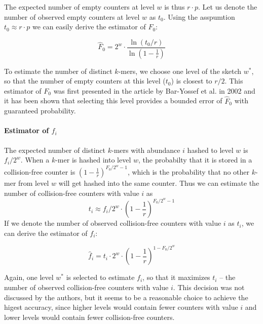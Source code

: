The expected number of empty counters at level $w$ is thus $r \cdot p$. Let us denote the
number of observed empty counters at level $w$ as $t_0$. Using the asspumtion
$t_0 \approx r \cdot p$ we can easily derive the estimator of $F_0$:

\begin{equation} \label{eq:hatF0}
\hat F_0 = 2^w \cdot \frac{\ln(t_0/r)}{\ln\left(1 - \frac{1}{r}\right)}
\end{equation}

To estimate the number of distinct $k$-mers, we choose one level of the sketch
$w^*$, so that the number of empty counters at this level ($t_0$) is closest to $r/2$.
This estimator of $F_0$ was first presented in the article by Bar-Yossef et al. in 2002
\cite{Bar-Yossef2002} and it has been shown that selecting this level provides a bounded 
error of $\hat F_0$ with guaranteed probability.

\paragraph{Estimator of $f_i$}
The expected number of distinct $k$-mers with abundance $i$ hashed to level $w$ is $f_i / 2^w$.
When a $k$-mer is hashed into level $w$, the probabilty that it is stored in a collision-free
counter is $(1 - \frac{1}{r})^{F_0/2^w - 1}$, which is the probability that no other $k$-mer 
from level $w$ will get hashed into the same counter. Thus we can estimate the number of
collision-free counters with value $i$ as 
\begin{equation} \label{eq:ti}
t_i \approx f_i / 2^w \cdot \left(1 - \frac{1}{r}\right)^{F_0/2^w - 1}
\end{equation}
If we denote the number of observed collision-free counters with value $i$ as $t_i$,
we can derive the estimator of $f_i$:

\begin{equation} \label{eq:hatfi}
\hat f_i = t_i \cdot 2^w \cdot \left(1 - \frac{1}{r}\right)^{1 - F_0/2^w}
\end{equation}


Again, one level $w^*$ is selected to estimate $f_i$, so that it maximizes $t_i$ -- the number 
of observed collision-free counters with value $i$. This decision was not discussed by the authors,
but it seems to be a reasonable choice to achieve the higest accuracy, since higher levels
would contain fewer counters with value $i$ and lower levels would contain fewer
collision-free counters.

